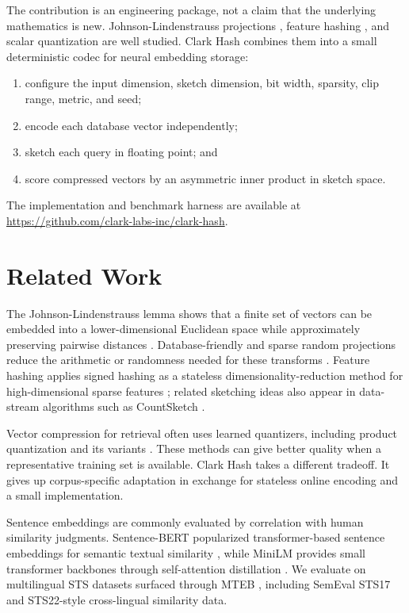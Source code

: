 \documentclass[11pt]{article}
\begin{document}
The contribution is an engineering package, not a claim that the underlying
mathematics is new. Johnson-Lindenstrauss projections
\cite{johnson1984extensions,achlioptas2003database,kane2014sparser}, feature
hashing \cite{weinberger2009feature}, and scalar quantization
\cite{gray1998quantization} are well studied. Clark Hash combines them into a
small deterministic codec for neural embedding storage:

\begin{enumerate}
  \item configure the input dimension, sketch dimension, bit width, sparsity,
        clip range, metric, and seed;
  \item encode each database vector independently;
  \item sketch each query in floating point; and
  \item score compressed vectors by an asymmetric inner product in sketch space.
\end{enumerate}

The implementation and benchmark harness are available at
\url{https://github.com/clark-labs-inc/clark-hash}.

\section{Related Work}

The Johnson-Lindenstrauss lemma shows that a finite set of vectors can be
embedded into a lower-dimensional Euclidean space while approximately
preserving pairwise distances \cite{johnson1984extensions}. Database-friendly
and sparse random projections reduce the arithmetic or randomness needed for
these transforms
\cite{achlioptas2003database,kane2014sparser,dasgupta2010sparse}. Feature
hashing applies signed hashing as a stateless dimensionality-reduction method
for high-dimensional sparse features \cite{weinberger2009feature}; related
sketching ideas also appear in data-stream algorithms such as CountSketch
\cite{charikar2002finding}.

Vector compression for retrieval often uses learned quantizers, including
product quantization and its variants \cite{jegou2011product}. These methods
can give better quality when a representative training set is available. Clark Hash
takes a different tradeoff. It gives up corpus-specific adaptation in exchange
for stateless online encoding and a small implementation.

Sentence embeddings are commonly evaluated by correlation with human similarity
judgments. Sentence-BERT popularized transformer-based sentence embeddings for
semantic textual similarity \cite{reimers2019sentencebert}, while MiniLM provides
small transformer backbones through self-attention distillation
\cite{wang2020minilm}. We evaluate on multilingual STS datasets surfaced through
MTEB \cite{muennighoff2022mteb}, including SemEval STS17
\cite{cer2017semeval} and STS22-style cross-lingual similarity data.
\end{document}
